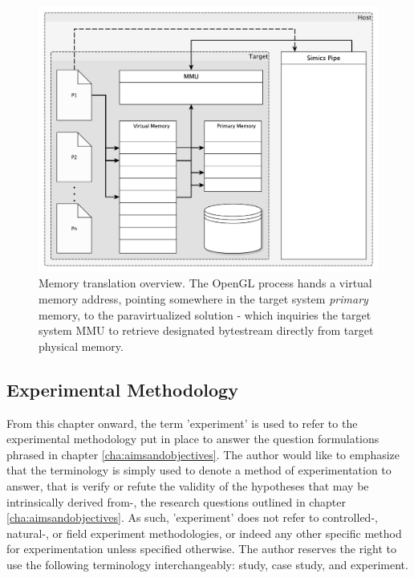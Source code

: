 \begin{figure}
\centering
\includegraphics[width=\linewidth]{img/yedvirtualmemory.pdf}
\caption[Memory translation overview]{Memory translation overview. The OpenGL process hands a virtual memory address, pointing somewhere in the target system \textit{primary} memory, to the paravirtualized solution - which inquiries the target system MMU to retrieve designated bytestream directly from target physical memory.} %
\label{fig:virtualmemory}
\end{figure}

\subsection{Experimental Methodology}
\label{sec:experimentalmethodology}
From this chapter onward, the term 'experiment' is used to refer to the experimental methodology put in place to answer the question formulations phrased in chapter \ref{cha:aimsandobjectives}.
The author would like to emphasize that the terminology is simply used to denote a method of experimentation to answer, that is verify or refute the validity of the hypotheses that may be intrinsically derived from-, the research questions outlined in chapter \ref{cha:aimsandobjectives}.
As such, 'experiment' does not refer to controlled-, natural-, or field experiment methodologies, or indeed any other specific method for experimentation unless specified otherwise.
The author reserves the right to use the following terminology interchangeably: study, case study, and experiment.

